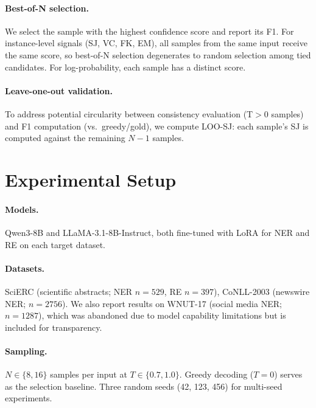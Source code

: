 \documentclass[11pt,a4paper]{article}
\begin{document}
\paragraph{Best-of-N selection.} We select the sample with the highest confidence score and report its F1. For instance-level signals (SJ, VC, FK, EM), all samples from the same input receive the same score, so best-of-N selection degenerates to random selection among tied candidates. For log-probability, each sample has a distinct score.

\paragraph{Leave-one-out validation.} To address potential circularity between consistency evaluation (T$>$0 samples) and F1 computation (vs.\ greedy/gold), we compute LOO-SJ: each sample's SJ is computed against the remaining $N-1$ samples.

\section{Experimental Setup}
\label{sec:setup}

\paragraph{Models.} Qwen3-8B and LLaMA-3.1-8B-Instruct, both fine-tuned with LoRA for NER and RE on each target dataset.

\paragraph{Datasets.} SciERC \cite{luan2018multi} (scientific abstracts; NER $n=529$, RE $n=397$), CoNLL-2003 \cite{tjong2003conll} (newswire NER; $n=2756$). We also report results on WNUT-17 \cite{derczynski2017results} (social media NER; $n=1287$), which was abandoned due to model capability limitations but is included for transparency.

\paragraph{Sampling.} $N \in \{8, 16\}$ samples per input at $T \in \{0.7, 1.0\}$. Greedy decoding ($T=0$) serves as the selection baseline. Three random seeds (42, 123, 456) for multi-seed experiments.

\end{document}
